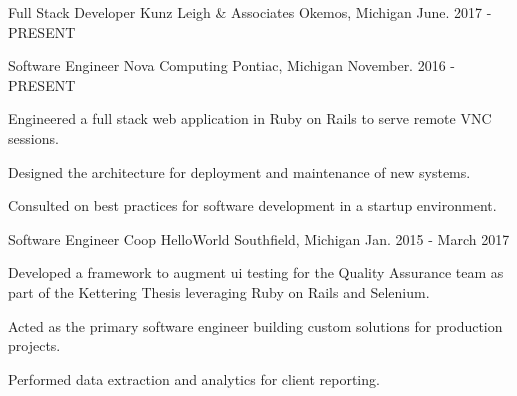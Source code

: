 
\begin{cventries}

  \cventry
    {Full Stack Developer} %
    {Kunz Leigh \& Associates} %
    {Okemos, Michigan} %
    {June. 2017 - PRESENT} %
    {
      \begin{cvitems} %
      \end{cvitems}
    }

  \cventry
    {Software Engineer} %
    {Nova Computing} %
    {Pontiac, Michigan} %
    {November. 2016 - PRESENT} %
    {
      \begin{cvitems} %
        \item {Engineered a full stack web application in Ruby on Rails to serve remote VNC sessions.}
        \item {Designed the architecture for deployment and maintenance of new systems.}
	      \item {Consulted on best practices for software development in a startup environment.}
      \end{cvitems}
    }


  \cventry
    {Software Engineer Coop} %
    {HelloWorld} %
    {Southfield, Michigan} %
    {Jan. 2015 - March 2017} %
    {
      \begin{cvitems} %
        \item {Developed a framework to augment ui testing for the Quality Assurance
        team as part of the Kettering Thesis leveraging Ruby on Rails and Selenium.}
        \item {Acted as the primary software engineer building custom solutions for production projects.}
        \item {Performed data extraction and analytics for client reporting.}
      \end{cvitems}
    }


\end{cventries}
